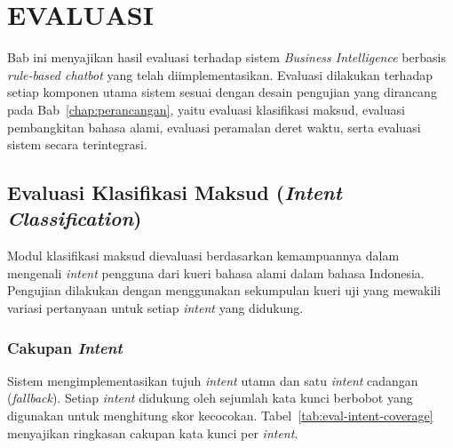 \cleardoublepage
\chapter{EVALUASI}
\label{chap:evaluasi}

Bab ini menyajikan hasil evaluasi terhadap sistem \textit{Business Intelligence} berbasis \textit{rule-based chatbot} yang telah diimplementasikan. Evaluasi dilakukan terhadap setiap komponen utama sistem sesuai dengan desain pengujian yang dirancang pada Bab~\ref{chap:perancangan}, yaitu evaluasi klasifikasi maksud, evaluasi pembangkitan bahasa alami, evaluasi peramalan deret waktu, serta evaluasi sistem secara terintegrasi.

\section{Evaluasi Klasifikasi Maksud (\textit{Intent Classification})}
\label{sec:eval-intent}

Modul klasifikasi maksud dievaluasi berdasarkan kemampuannya dalam mengenali \textit{intent} pengguna dari kueri bahasa alami dalam bahasa Indonesia. Pengujian dilakukan dengan menggunakan sekumpulan kueri uji yang mewakili variasi pertanyaan untuk setiap \textit{intent} yang didukung.

\subsection{Cakupan \textit{Intent}}

Sistem mengimplementasikan tujuh \textit{intent} utama dan satu \textit{intent} cadangan (\textit{fallback}). Setiap \textit{intent} didukung oleh sejumlah kata kunci berbobot yang digunakan untuk menghitung skor kecocokan. Tabel~\ref{tab:eval-intent-coverage} menyajikan ringkasan cakupan kata kunci per \textit{intent}.

